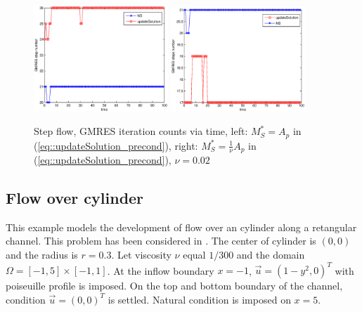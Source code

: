 \documentclass{eajam}
\begin{document}
      \begin{figure}[!htbp]
        \begin{center}
          \includegraphics[width = 0.45\textwidth, angle = 0]{picture/L_shaped_flow_data/iterate_steps.eps}
          \includegraphics[width = 0.45\textwidth, angle = 0]{picture/L_shaped_flow_data/iterate_steps_scale_Ap.eps}
        \end{center}
        \caption{\small Step flow, GMRES iteration counts via time,
          left: $M_S^* = A_p$ in (\ref{eq::updateSolution_precond}),
          right: $M_S^* = \frac{1}{\nu} A_p$ in
          (\ref{eq::updateSolution_precond}), $\nu = 0.02$}
        \label{fig::GMRES_steps_total}
      \end{figure}

   \subsection{Flow over cylinder}
   
      This example models the development of flow over an cylinder
      along a retangular channel. This problem has been considered in
      \cite{cao1999anr}. The center of cylinder is $(0, 0)$ and the
      radius is $r = 0.3$. Let viscosity $\nu$  equal  $1 / 300$ and
      the domain $\Omega = [-1, 5] \times [-1, 1]$. At the inflow
      boundary $x = -1$, $\vec{u} = (1 - y^2, 0)^T$ with poiseuille
      profile is imposed. On the top and bottom boundary of the
      channel, condition $\vec{u} = (0, 0)^T$ is settled. Natural
      condition is imposed on $x = 5$. 
      
\end{document}
